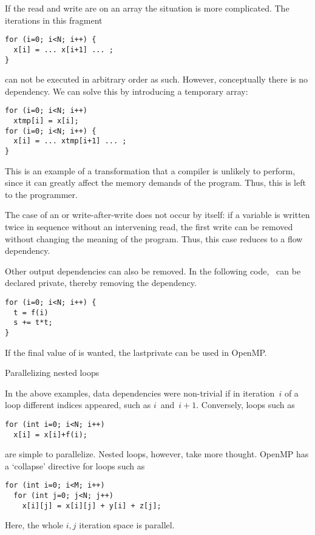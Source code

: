 If the read and write are on an array the situation is more complicated.
The iterations in this fragment
\lstset{language=C}
\begin{lstlisting}
for (i=0; i<N; i++) {
  x[i] = ... x[i+1] ... ;
}
\end{lstlisting}
can not be executed in arbitrary order as such. However, conceptually there
is no dependency. We can solve this by introducing a temporary array:
\lstset{language=C}
\begin{lstlisting}
for (i=0; i<N; i++)
  xtmp[i] = x[i];
for (i=0; i<N; i++) {
  x[i] = ... xtmp[i+1] ... ;
}
\end{lstlisting}
This is an example of a transformation that a compiler is unlikely
to perform, since it can greatly affect the memory demands of the program.
Thus, this is left to the programmer.


The case of an  or write-after-write
does not occur by itself: if a variable is written twice in sequence
without an intervening read, the first write can be removed without
changing the meaning of the program.  Thus, this case reduces to a
flow dependency.

Other output dependencies can also be removed. In the following code, ~can be
declared private, thereby removing the dependency.
\lstset{language=C}
\begin{lstlisting}
for (i=0; i<N; i++) {
  t = f(i)
  s += t*t;
}
\end{lstlisting}
If the final value of  is wanted, the lastprivate can be used in OpenMP.


 {Parallelizing nested loops}

In the above examples, data dependencies were non-trivial if in
iteration~$i$ of a loop different indices appeared, such as
$i$~and~$i+1$. Conversely, loops such as
\lstset{language=C}
\begin{lstlisting}
for (int i=0; i<N; i++)
  x[i] = x[i]+f(i);
\end{lstlisting}
are simple to parallelize. Nested loops, however, take more
thought. OpenMP has a `collapse' directive for loops such as
\lstset{language=C}
\begin{lstlisting}
for (int i=0; i<M; i++)
  for (int j=0; j<N; j++)
    x[i][j] = x[i][j] + y[i] + z[j];
\end{lstlisting}
Here, the whole $i,j$ iteration space is parallel.

